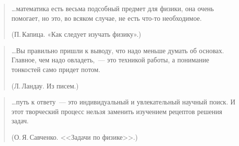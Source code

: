 \documentclass[main.tex]{subfiles}
\begin{document}
{\small
\begin{quote}
    \ldots математика есть весьма подсобный предмет для физики, она очень помогает, но это, во всяком случае, не есть что-то необходимое.

    (П.\,Капица. «Как следует изучать физику».)
\end{quote}
\begin{quote}
    \ldots Вы правильно пришли к выводу, что надо меньше думать об основах. Главное, чем надо овладеть,~--- это техникой работы, а понимание тонкостей само придет потом.

    (Л.\,Ландау. Из писем.)
\end{quote}
\begin{quote}
    \ldots путь к ответу~--- это индивидуальный и увлекательный научный поиск. И этот творческий процесс нельзя заменить изучением рецептов решения задач.

    (О.\,Я.\,Савченко. <<Задачи по физике>>.)
\end{quote}
    
}
\end{document}
